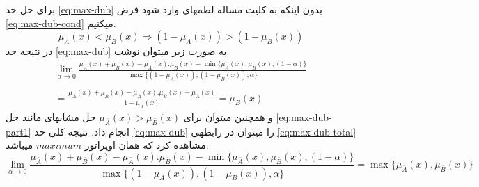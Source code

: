 \documentclass[10pt,a4paper]{article}
\newcommand{\نیمفاصله}{\halfspace}
\renewcommand{\ }{\halfspace}
\newcommand{\renderref}[1] { \begingroup \let\clearpage\relax  \endgroup }
\newcommand{\mba}{\mu_{\bar{A}}}
\newcommand{\mbb}{\mu_{\bar{B}}}
\begin{document}
برای حل حد
\ref{eq:max-dub}
بدون اینکه به کلیت مساله لطمه\ ای وارد شود فرض
\ref{eq:max-dub-cond}
می\ کنیم.
\begin{equation}
\mba(x) < \mbb(x)  \Longrightarrow  (1 - \mba(x)) > (1 - \mbb(x))
\label{eq:max-dub-cond}
\end{equation}
در نتیجه حد
\ref{eq:max-dub}
به صورت زیر می\ توان نوشت.
\begin{equation}
\begin{split}
\lim_{\alpha \rightarrow 0} \frac{\mba(x) + \mbb(x) - \mba(x).\mbb(x) - \min\{\mba(x), \mbb(x), (1-\alpha)\}}{\max\{(1-\mba(x)), (1-\mbb(x)), \alpha\}}\\\\
= \frac{\mba(x) + \mbb(x) - \mba(x).\mbb(x) - \mba(x)}{1-\mba(x)} = \mbb(x)
\end{split}
\label{eq:max-dub-part1}
\end{equation}
و همچنین می\ توان برای
$\mba(x) > \mbb(x)$
حل مشابه\ ای مانند حل
\ref{eq:max-dub-part1}
انجام داد. نتیجه کلی حد
\ref{eq:max-dub}
را می\ توان در رابطه\ ی
\ref{eq:max-dub-total}
مشاهده کرد که همان اوپراتور
$maximum$
می\ باشد.
\begin{equation}
\lim_{\alpha \rightarrow 0} \frac{\mba(x) + \mbb(x) - \mba(x).\mbb(x) - \min\{\mba(x), \mbb(x), (1-\alpha)\}}{\max\{(1-\mba(x)), (1-\mbb(x)), \alpha\}} = \max\{\mba(x) , \mbb(x)\}
\label{eq:max-dub-total}
\end{equation}
\renderref{reference}
\end{document}
